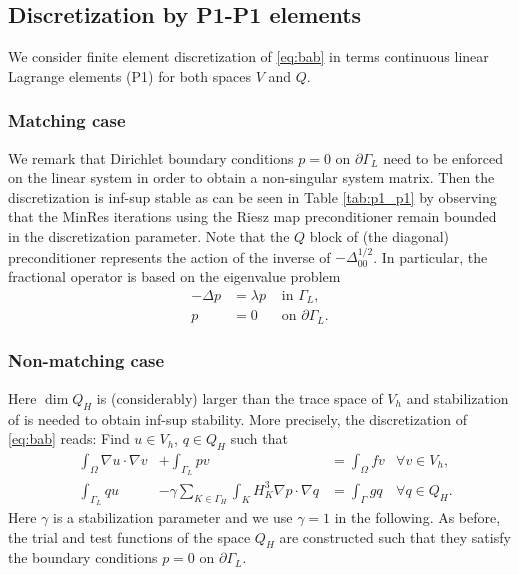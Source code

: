 \documentclass[r]{siamart171218}
\begin{document}
\subsection{Discretization by P1-P1 elements}\label{sec:p1_p1} We consider
finite element discretization of \eqref{eq:bab} in terms continuous linear
Lagrange elements (P1) for both spaces $V$ and $Q$.

\subsubsection{Matching case} We remark that Dirichlet boundary conditions
$p=0$ on $\partial\Gamma_L$ need to be enforced on the linear system in order
to obtain a non-singular system matrix. Then the discretization is inf-sup
stable as can be seen in Table \ref{tab:p1_p1} by observing that the MinRes
iterations using the Riesz map preconditioner remain bounded in the discretization
parameter. Note that the $Q$ block of (the diagonal) preconditioner represents
the action of the inverse of $-\Delta^{1/2}_{00}$. In particular, the fractional
operator is based on the eigenvalue problem
%
\[
\begin{aligned}
  -\Delta p &= \lambda p &\mbox{ in }\Gamma_L,\\
          p &= 0         &\mbox{ on }\partial\Gamma_L.
\end{aligned}
\]
%

\subsubsection{Non-matching case} Here $\dim Q_H$ is (considerably) larger
than the trace space of $V_h$ and stabilization of \cite{burman2009interior}
is needed to obtain inf-sup stability. More precisely, the discretization
of \eqref{eq:bab} reads: Find $u\in V_h$, $q\in Q_H$ such that
%
\begin{equation}\label{eq:p1_stab}
\begin{aligned}
&\int_{\Omega} \nabla u\cdot \nabla v &+ \int_{\Gamma_L}p v &= \int_{\Omega} f v &\forall v\in V_h,\\
  &\int_{\Gamma_L}q u  &-\gamma \sum_{K\in\Gamma_H}\int_{K} H_K^3\nabla p\cdot\nabla q &= \int_{\Gamma} g q &\forall q\in Q_H.
  \end{aligned}
\end{equation}
%
Here $\gamma$ is a stabilization parameter and we use $\gamma=1$ in the
following. As before, the trial and test functions of the space $Q_H$ are
constructed such that they satisfy the boundary conditions $p=0$ on $\partial\Gamma_L$.
\end{document}
